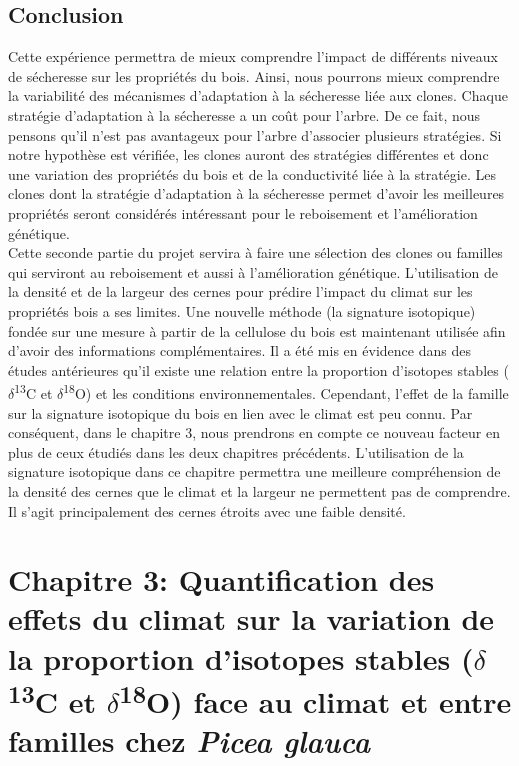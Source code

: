 \documentclass[a4paper,12pt]{report}
\newcommand{\Ctreize}{$\delta$\textsuperscript{13}C\xspace}
\newcommand{\Odixhuit}{$\delta$\textsuperscript{18}O\xspace}
\begin{document}
\section{Conclusion}

Cette expérience permettra de mieux comprendre l'impact de différents niveaux de sécheresse sur les propriétés du bois. Ainsi, nous pourrons mieux comprendre la variabilité des mécanismes d'adaptation à la sécheresse liée aux clones. Chaque stratégie d'adaptation à la sécheresse a un coût pour l'arbre. De ce fait, nous pensons qu'il n'est pas avantageux pour l'arbre d'associer plusieurs stratégies. Si notre hypothèse est vérifiée, les clones auront des stratégies différentes et donc une variation des propriétés du bois et de la conductivité liée à la stratégie. Les clones dont la stratégie d'adaptation à la sécheresse permet d'avoir les meilleures propriétés seront considérés intéressant pour le reboisement et l'amélioration génétique.\\

Cette seconde partie du projet servira à faire une sélection des clones ou familles qui serviront au reboisement et aussi à l'amélioration génétique. L'utilisation de la densité et de la largeur des cernes pour prédire l'impact du climat sur les propriétés bois a ses limites. Une nouvelle méthode (la signature isotopique) fondée sur une mesure à partir de la cellulose du bois est maintenant utilisée afin d'avoir des informations complémentaires. Il a été mis en évidence dans des études antérieures qu'il existe une relation entre la proportion d'isotopes stables (\Ctreize et \Odixhuit) et les conditions environnementales. Cependant, l'effet de la famille sur la signature isotopique du bois en lien avec le climat est peu connu.  Par conséquent, dans le chapitre 3, nous prendrons en compte ce nouveau facteur en plus de ceux étudiés dans les deux chapitres précédents. L'utilisation de la signature isotopique dans ce chapitre permettra une meilleure compréhension de la densité des cernes que le climat et la largeur ne permettent pas de comprendre. Il s'agit principalement des cernes étroits avec une faible densité.


\chapter{Chapitre 3: Quantification des effets du climat sur la variation de la proportion d'isotopes stables (\Ctreize et \Odixhuit) face au climat et entre familles chez \textit{Picea glauca}}
\end{document}
